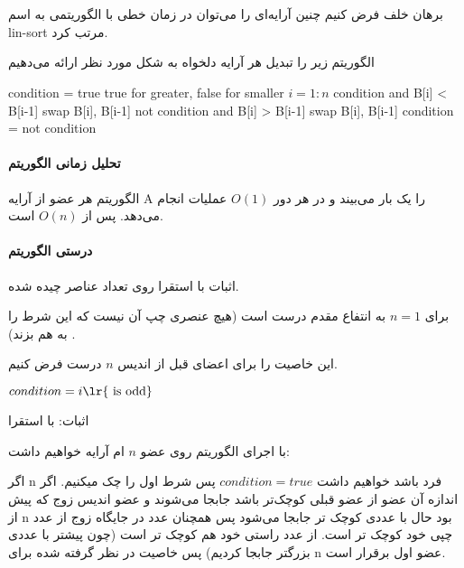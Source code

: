 \section{}
\proof برهان خلف
فرض کنیم 
چنین آرایه‌ای را می‌توان در زمان خطی با الگوریتمی به اسم lin-sort مرتب کرد. 

الگوریتم زیر را 
تبدیل هر آرایه دلخواه به شکل مورد نظر ارائه می‌دهیم
\begin{latin}
\begin{codebox}
\li condition = true \Comment true for greater, false for smaller
\li	\For $i=1:n$ \Then
	\li \If condition and B[i] < B[i-1] \Then 
	\li	swap B[i], B[i-1]
	\End
	\li \If not condition and B[i] > B[i-1] \Then
	\li swap B[i], B[i-1]
	\End
	\li condition = not condition
	\End
\end{codebox}
\end{latin}

\paragraph{تحلیل زمانی الگوریتم}
 الگوریتم هر عضو از آرایه A را یک بار می‌بیند و در هر دور $O(1)$ عملیات انجام می‌دهد.
پس از 
$O(n)$ 
است.

\paragraph{درستی الگوریتم}
اثبات با استقرا روی تعداد عناصر چیده شده.

برای $n=1$ به انتفاع مقدم درست است 
(هیچ عنصری چپ آن نیست که این شرط را به هم بزند)
.

 این خاصیت را برای اعضای قبل از اندیس
 $n$
درست فرض کنیم. 

\begin{lemma}
	$condition = i \text{\lr{ is odd}}$

	اثبات:	با استقرا
\end{lemma}

با اجرای الگوریتم روی عضو
$n$
ام آرایه
خواهیم داشت:

اگر n فرد باشد خواهیم داشت 
$condition = true$
پس شرط اول را چک میکنیم.
اگر اندازه آن عضو
از عضو قبلی کوچک‌تر باشد جابجا می‌شوند و 
عضو اندیس زوج که پیش از n بود حال با عددی کوچک تر جابجا می‌شود پس همچنان عدد در جایگاه زوج از عدد چپی خود کوچک تر است. از عدد راستی خود هم کوچک تر است (چون پیشتر با عددی بزرگتر جابجا کردیم) پس خاصیت در نظر گرفته شده برای n عضو اول برقرار است.

